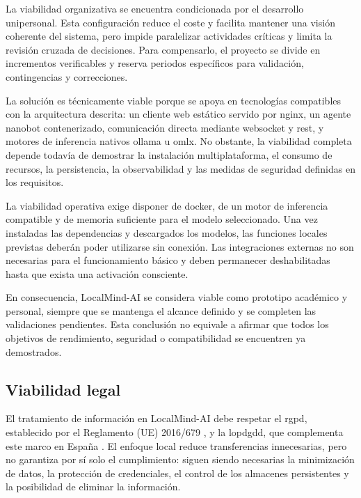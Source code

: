 La viabilidad organizativa se encuentra condicionada por el desarrollo unipersonal. Esta configuración reduce el coste y facilita mantener una visión coherente del sistema, pero impide paralelizar actividades críticas y limita la revisión cruzada de decisiones. Para compensarlo, el proyecto se divide en incrementos verificables y reserva periodos específicos para validación, contingencias y correcciones.

La solución es técnicamente viable porque se apoya en tecnologías compatibles con la arquitectura descrita: un cliente web estático servido por \gls{nginx}, un agente \gls{nanobot} contenerizado, comunicación directa mediante \gls{websocket} y \gls{rest}, y motores de inferencia nativos \gls{ollama} u \gls{omlx}. No obstante, la viabilidad completa depende todavía de demostrar la instalación multiplataforma, el consumo de recursos, la persistencia, la observabilidad y las medidas de seguridad definidas en los requisitos.

La viabilidad operativa exige disponer de \gls{docker}, de un motor de inferencia compatible y de memoria suficiente para el modelo seleccionado. Una vez instaladas las dependencias y descargados los modelos, las funciones locales previstas deberán poder utilizarse sin conexión. Las integraciones externas no son necesarias para el funcionamiento básico y deben permanecer deshabilitadas hasta que exista una activación consciente.

En consecuencia, LocalMind-AI se considera viable como prototipo académico y personal, siempre que se mantenga el alcance definido y se completen las validaciones pendientes. Esta conclusión no equivale a afirmar que todos los objetivos de rendimiento, seguridad o compatibilidad se encuentren ya demostrados.

\subsection{Viabilidad legal}

El tratamiento de información en LocalMind-AI debe respetar el \gls{rgpd}, establecido por el Reglamento (UE) 2016/679 \cite{ReglamentoUE20162016}, y la \gls{lopdgdd}, que complementa este marco en España \cite{BOEA201816673LeyOrganica}. El enfoque local reduce transferencias innecesarias, pero no garantiza por sí solo el cumplimiento: siguen siendo necesarias la minimización de datos, la protección de credenciales, el control de los almacenes persistentes y la posibilidad de eliminar la información.

